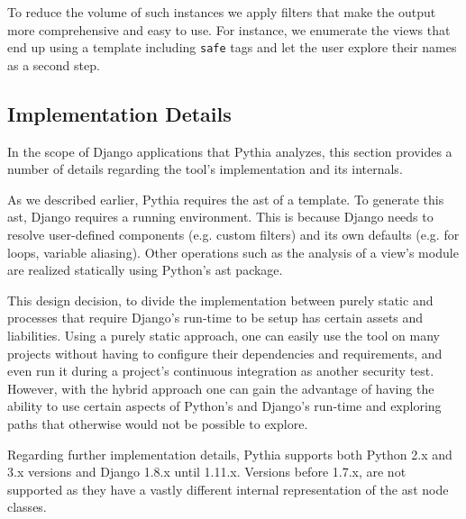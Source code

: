 To reduce the volume of such instances
we apply filters that make the output
more comprehensive and easy to use.
For instance,
we enumerate the views that end up
using a template including {\tt safe} tags
and let the user explore their names as a
second step.

\subsection{Implementation Details}
\label{sec:implementation}

In the scope of Django applications that 
Pythia analyzes, this section provides 
a number of details regarding
the tool's implementation and its internals.

As we described earlier,
Pythia requires the {\sc ast} of a template.
To generate this {\sc ast},
Django requires a running environment.
This is because Django needs to resolve
user-defined components (e.g. custom filters)
and its own defaults (e.g. for loops, variable aliasing).
Other operations such as the analysis of a view's
module are realized statically using Python's
{\sc ast} package.

This design decision, to divide the implementation
between purely static and processes that require
Django's run-time to be setup has certain
assets and liabilities.
Using a purely static approach,
one can easily use the tool on many projects
without having to configure their dependencies
and requirements,
and even run it during a project's continuous
integration as another security test.
However,
with the hybrid approach one can gain the
advantage of having the ability to use
certain aspects of Python's and Django's
run-time and exploring paths that
otherwise would not be possible to explore. 

Regarding further implementation details, 
Pythia supports both Python 2.x and 3.x
versions and Django 1.8.x until 1.11.x. Versions 
before 1.7.x, are not supported as they have a
vastly different internal representation
of the {\sc ast} node classes.
